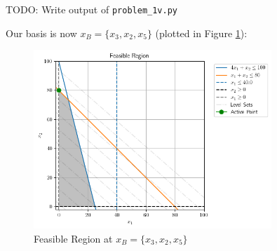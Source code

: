 \begin{solution}
  TODO: Write output of \texttt{problem\_1v.py}

  Our basis is now $x_B = \{x_3, x_2, x_5\}$ (plotted in Figure \ref{fig:problem_1v_iteration_2}):

  \begin{figure}[h]
    \centering
    \includegraphics*[width=0.8\textwidth]{problem_1v_2.png}
    \caption{Feasible Region at $x_B = \{x_3, x_2, x_5 \}$}
    \label{fig:problem_1v_iteration_2}
  \end{figure}

  \ \\
\end{solution}